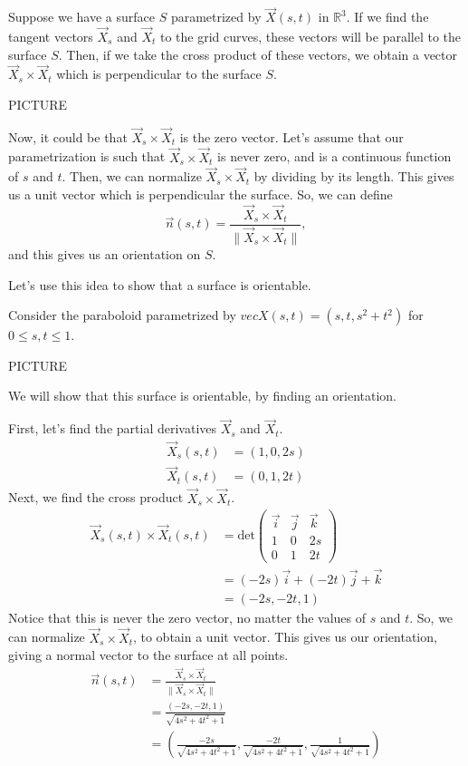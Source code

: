 \documentclass{ximera}
\begin{document}
Suppose we have a surface $S$ parametrized by $\vec{X}(s,t)$ in $\mathbb{R}^3$. If we find the tangent vectors $\vec{X}_s$ and $\vec{X}_t$ to the grid curves, these vectors will be parallel to the surface $S$. Then, if we take the cross product of these vectors, we obtain a vector $\vec{X}_s\times \vec{X}_t$ which is perpendicular to the surface $S$.

PICTURE

Now, it could be that $\vec{X}_s\times \vec{X}_t$ is the zero vector. Let's assume that our parametrization is such that $\vec{X}_s\times\vec{X}_t$ is never zero, and is a continuous function of $s$ and $t$. Then, we can normalize $\vec{X}_s\times \vec{X}_t$ by dividing by its length. This gives us a unit vector which is perpendicular the surface. So, we can define
\[
\vec{n}(s,t) = \frac{\vec{X}_s\times\vec{X}_t}{\|\vec{X}_s\times\vec{X}_t\|},
\]
and this gives us an orientation on $S$.

Let's use this idea to show that a surface is orientable.

\begin{example}
Consider the paraboloid parametrized by $vec{X}(s,t) = (s, t, s^2+t^2)$ for $0\leq s,t\leq 1$.

PICTURE

We will show that this surface is orientable, by finding an orientation.

First, let's find the partial derivatives $\vec{X}_s$ and $\vec{X}_t$.
\begin{align*}
\vec{X}_s(s,t) &= (1,0,2s)\\
\vec{X}_t(s,t) &= (0,1,2t)
\end{align*}
Next, we find the cross product $\vec{X}_s\times\vec{X}_t$.
\begin{align*}
\vec{X}_s(s,t)\times\vec{X}_t(s,t) &= \text{det}\begin{pmatrix}
\vec{i} & \vec{j} & \vec{k}\\
1 & 0 & 2s\\
0 & 1 & 2t
\end{pmatrix}\\
&= (-2s)\vec{i} + (-2t)\vec{j} + \vec{k}\\
&= (-2s,-2t,1)
\end{align*}
Notice that this is never the zero vector, no matter the values of $s$ and $t$. So, we can normalize $\vec{X}_s\times\vec{X}_t$, to obtain a unit vector. This gives us our orientation, giving a normal vector to the surface at all points.
\begin{align*}
\vec{n}(s,t) &= \frac{\vec{X}_s\times\vec{X}_t}{\|\vec{X}_s\times\vec{X}_t\|}\\
&= \frac{(-2s,-2t,1)}{\sqrt{4s^2+4t^2+1}}\\
&= \left(\frac{-2s}{\sqrt{4s^2+4t^2+1}}, \frac{-2t}{\sqrt{4s^2+4t^2+1}}, \frac{1}{\sqrt{4s^2+4t^2+1}}\right)
\end{align*}
\end{example}
\end{document}

